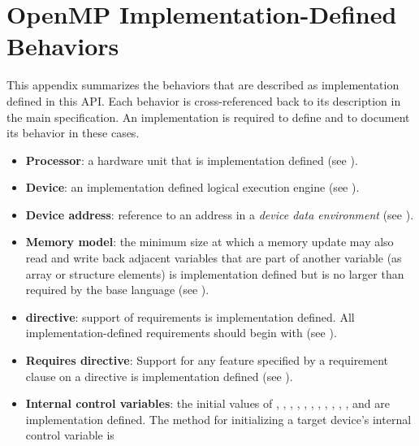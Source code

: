 \chapter{OpenMP Implementation-Defined Behaviors}
\label{chap:OpenMP Implementation-Defined Behaviors}
This appendix summarizes the behaviors that are described as implementation 
defined in this API. Each behavior is cross-referenced back to its description 
in the main specification. An implementation is required to define and to document 
its behavior in these cases.

\begin{itemize}
\item \textbf{Processor}: a hardware unit that is implementation defined (see
      ).
\item \textbf{Device}: an implementation defined logical execution engine (see
      ).
\item \textbf{Device address}: reference to an address in a 
      \emph{device data environment} (see ).
\item \textbf{Memory model}: the minimum size at which a memory update may 
      also read and write back adjacent variables that are part of another 
      variable (as array or structure elements) is implementation defined but 
      is no larger than required by the base language (see 
      ).
\item {} \textbf{directive}: support of requirements is 
      implementation defined. All implementation-defined requirements should 
      begin with  (see ).
\item \textbf{Requires directive}: Support for any feature specified by a
      requirement clause on a  directive is implementation
      defined (see ).
\item \textbf{Internal control variables}: the initial values of
      , , ,
      , , ,
      , ,
      , , 
      ,  and 
       are implementation defined.  The method for
      initializing a target device's internal control variable is

\end{itemize}

